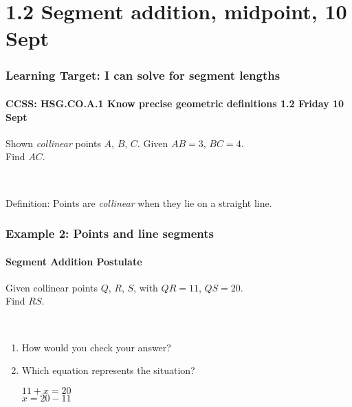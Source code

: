 \documentclass{beamer}
\begin{document}
\section{1.2 Segment addition, midpoint, 10 Sept}
\frame
{
  \frametitle{Learning Target: I can solve for segment lengths}
  \framesubtitle{CCSS: HSG.CO.A.1 Know precise geometric definitions  \hfill \alert{1.2 Friday 10 Sept}}
  Shown \emph{collinear} points $A$, $B$, $C$. Given $AB=3$, $BC=4$. \\[0.15in]
  Find $AC$. \\[0.25in]
       \\ \vspace{1cm}
    
    Definition: Points are \emph{collinear} when they lie on a straight line.
}

\frame
{
  \frametitle{Example 2: Points and line segments}
  \framesubtitle{Segment Addition Postulate}
  Given collinear points $Q$, $R$, $S$, with $QR=11$, $QS=20$. \\[0.15in]
  Find $RS$. \\[0.25in]
       \\ \vspace{0.2cm}
    \begin{enumerate}
      \item How would you check your answer?
      \item Which equation represents the situation?
      \begin{multicols}{2}
        $11 + x = 20$ \\
        $x = 20 - 11$
      \end{multicols}
    \end{enumerate}
}
\end{document}
